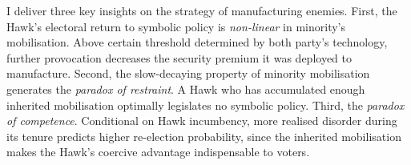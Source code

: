 \documentclass[11pt,twoside]{extarticle}
\begin{document}

I deliver three key insights on the strategy of manufacturing enemies. First, the Hawk's electoral return to symbolic policy is \emph{non-linear} in minority's mobilisation. Above certain threshold determined by both party's technology, further provocation decreases the security premium it was deployed to manufacture. Second, the slow-decaying property of minority mobilisation generates the \emph{paradox of restraint}. A Hawk who has accumulated enough inherited mobilisation optimally legislates no symbolic policy. Third, the \emph{paradox of competence}. Conditional on Hawk incumbency, more realised disorder during its tenure predicts higher re-election probability, since the inherited mobilisation makes the Hawk's coercive advantage indispensable to voters.


\end{document}
